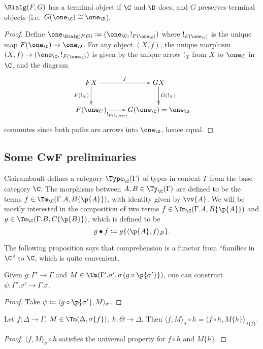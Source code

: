 \documentclass{article}
\begin{document}
\begin{lemma}
  $\Bialg(F, G)$ has a terminal object if $\C$ and $\D$ does, and $G$
  preserves terminal objects (i.e.\ $G(\one_\C) \cong \one_\D$).
\end{lemma}
\begin{proof}
  Define $\one_{\Bialg(F, G)} \coloneqq (\one_\C, !_{F(\one_\C)})$
  where $!_{F(\one_\C)}$ is the unique map $F(\one_\C) \to
  \one_D$. For any object $(X, f)$, the unique morphism $(X, f) \to
  (\one_\C, !_{F(\one_\C)})$ is given by the unique arrow $!_{X}$ from
  $X$ to $\one_C$ in $\C$, and the diagram
\[
\xymatrix{
FX \ar^-{f}[r] \ar_-{F(!_{X})}[d] & GX \ar^-{G(!_{X})}[d] \\
F(\one_C) \ar_-{!_{F(\one_C)}}[r] & G(\one_\C) = \one_\D
}
\]
commutes since both paths are arrows into $\one_\D$, hence equal.
\end{proof}

\subsection{Some CwF preliminaries}

Clairambault \cite[4.1]{clairambault2006cwf} defines a category
$\Type_\C(\Gamma)$ of types in context $\Gamma$ from the base category
$\C$. The morphisms between $A, B \in \Ty_\C(\Gamma)$ are defined to
be the terms $f \in \Tm_\C(\Gamma.A, B\{\p{A}\})$, with identity given
by $\vv{A}$. We will be mostly interested in the composition of two
terms $f \in \Tm_\C(\Gamma.A, B\{\p{A}\})$ and $g \in \Tm_\C(\Gamma.B,
C\{\p{B}\})$, which is defined to be
\[
g \bullet f \coloneqq g\{\langle \p{A}, f\rangle_{B}\}.
\]

The following proposition says that comprehension is a functor from
``families in $\C$'' to $\C$, which is quite convenient.
\begin{lemma}
\label{compfunctor}
  Given $g : \Gamma' \to \Gamma$ and $M \in \Tm(\Gamma'.\sigma',
  \sigma\{g \circ \p{\sigma'}\})$, one can construct $\psi :
  \Gamma'.\sigma' \to \Gamma.\sigma$.
\end{lemma}
\begin{proof}
Take $\psi \coloneqq \langle g \circ \p{\sigma'}, M\rangle_{\sigma}$.
\end{proof}

\begin{lemma}
  Let $f : \Delta \to \Gamma$, $M \in \Tm(\Delta, \sigma\{f\})$, $h :
  \Theta \to \Delta$. Then $\langle f, M\rangle_\sigma \circ h = \langle f \circ h, M\{h\}\rangle_{\sigma\{f\}}$.
\end{lemma}
\begin{proof}
  $\langle f, M\rangle_\sigma \circ h$ satisfies the universal
  property for $f \circ h$ and $M\{h\}$.
\end{proof}
\end{document}
